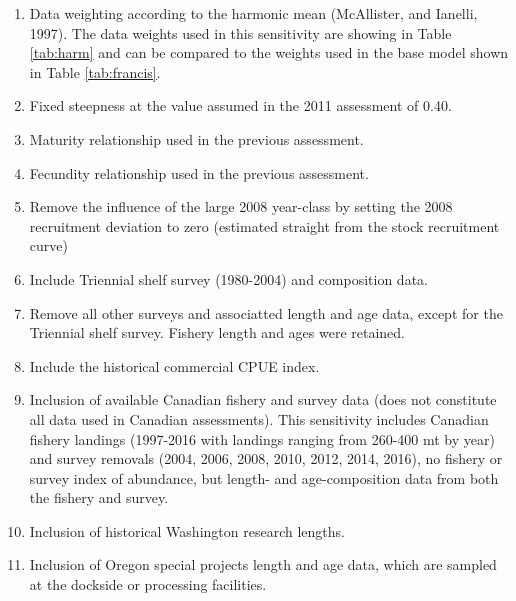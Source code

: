 \documentclass[12pt,]{article}
\begin{document}
\begin{enumerate}

  \item Data weighting according to the harmonic mean (McAllister, and Ianelli, 1997).  The data weights used in this sensitivity are showing in Table \ref{tab:harm} and can be compared to the weights used in the base model shown in Table \ref{tab:francis}.
  
  \item Fixed steepness at the value assumed in the 2011 assessment of 0.40.
  
  \item Maturity relationship used in the previous assessment.
  
  \item Fecundity relationship used in the previous assessment.
  
  \item Remove the influence of the large 2008 year-class by setting the 2008 recruitment deviation to zero (estimated straight from the stock recruitment curve)
  
  \item Include Triennial shelf survey (1980-2004) and composition data.
  
  \item Remove all other surveys and associatted length and age data, except for the Triennial shelf survey.  Fishery length and ages were retained.  
  
  \item Include the historical commercial CPUE index.
  
  \item Inclusion of available Canadian fishery and survey data (does not constitute all data used in Canadian assessments).  This sensitivity includes Canadian fishery landings (1997-2016 with landings ranging from 260-400 mt by year) and survey removals (2004, 2006, 2008, 2010, 2012, 2014, 2016), no fishery or survey index of abundance, but length- and age-composition data from both the fishery and survey.  
  
  \item Inclusion of historical Washington research lengths.  
  
  \item Inclusion of Oregon special projects length and age data, which are sampled at the dockside or processing facilities.  
  
\end{enumerate}
\end{document}
